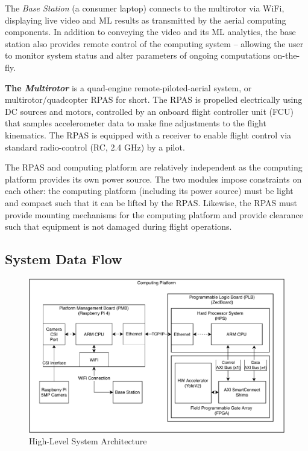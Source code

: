 The \textit{Base Station} (a consumer laptop) connects to the multirotor via WiFi, displaying live video and ML results as transmitted by the aerial computing components. In addition to conveying the video and its ML analytics, the base station also provides remote control of the computing system -- allowing the user to monitor system status and alter parameters of ongoing computations on-the-fly.

\textbf{The \textit{Multirotor}} is a quad-engine remote-piloted-aerial system, or multirotor/quadcopter RPAS for short.
The RPAS is propelled electrically using DC sources and motors, controlled by an onboard flight controller unit (FCU) that samples accelerometer data to make fine adjustments to the flight kinematics.
The RPAS is equipped with a receiver to enable flight control via standard radio-control (RC, 2.4 GHz) by a pilot.

The RPAS and computing platform are relatively independent as the computing platform provides its own power source. The two modules impose constraints on each other: the computing platform (including its power source) must be light and compact such that it can be lifted by the RPAS. 
Likewise, the RPAS must provide mounting mechanisms for the computing platform and provide clearance such that equipment is not damaged during flight operations.

\subsection{System Data Flow}

\begin{figure}[H]
\centering
\includegraphics[width=15cm]{img/pc_diagram.pdf}
\caption{High-Level System Architecture}
\label{pcdiag}
\end{figure}

